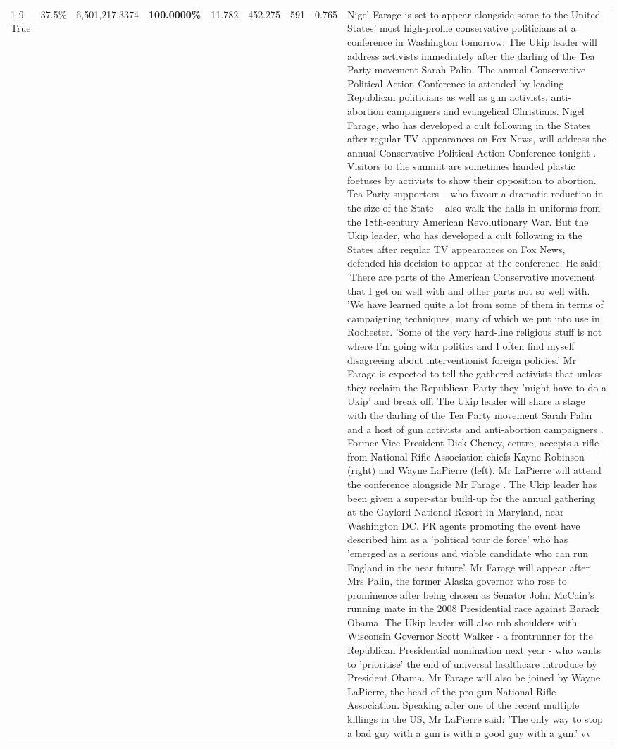 \begin{table}[H]
\begin{tabular}{lllrlllll}
\cline{1-9}
True & 37.5\% & 6,501,217.3374 & \bfseries \color{red} 100.0000\% & 11.782 & 452.275 & 591 & 0.765 & Nigel Farage is set to appear alongside some to the United States' most high-profile conservative politicians at a conference in Washington tomorrow. The Ukip leader will address activists immediately after the darling of the Tea Party movement Sarah Palin. The annual Conservative Political Action Conference is attended by leading Republican politicians as well as gun activists, anti-abortion campaigners and evangelical Christians. Nigel Farage, who has developed a cult following in the States after regular TV appearances on Fox News, will address the annual Conservative Political Action Conference tonight . Visitors to the summit are sometimes handed plastic foetuses by activists to show their opposition to abortion. Tea Party supporters – who favour a dramatic reduction in the size of the State – also walk the halls in uniforms from the 18th-century American Revolutionary War. But the Ukip leader, who has developed a cult following in the States after regular TV appearances on Fox News, defended his decision to appear at the conference. He said: 'There are parts of the American Conservative movement that I get on well with and other parts not so well with. 'We have learned quite a lot from some of them in terms of campaigning techniques, many of which we put into use in Rochester. 'Some of the very hard-line religious stuff is not where I'm going with politics and I often find myself disagreeing about interventionist foreign policies.' Mr Farage is expected to tell the gathered activists that unless they reclaim the Republican Party they 'might have to do a Ukip' and break off. The Ukip leader will share a stage with the darling of the Tea Party movement Sarah Palin and a host of gun activists and anti-abortion campaigners . Former Vice President Dick Cheney, centre, accepts a rifle from National Rifle Association chiefs Kayne Robinson (right) and Wayne LaPierre (left). Mr LaPierre will attend the conference alongside Mr Farage . The Ukip leader has been given a super-star build-up for the annual gathering at the Gaylord National Resort in Maryland, near Washington DC. PR agents promoting the event have described him as a 'political tour de force' who has 'emerged as a serious and viable candidate who can run England in the near future'. Mr Farage will appear after Mrs Palin, the former Alaska governor who rose to prominence after being chosen as Senator John McCain's running mate in the 2008 Presidential race against Barack Obama. The Ukip leader will also rub shoulders with Wisconsin Governor Scott Walker - a frontrunner for the Republican Presidential nomination next year - who wants to 'prioritise' the end of universal healthcare introduce by President Obama. Mr Farage will also be joined by Wayne LaPierre, the head of the pro-gun National Rifle Association. Speaking after one of the recent multiple killings in the US, Mr LaPierre said: 'The only way to stop a bad guy with a gun is with a good guy with a gun.' vv \\

\end{tabular}
\end{table}
